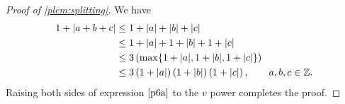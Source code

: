 %
%
\begin{proof}[Proof of \cref{plem:splitting}] We have
%
%
\begin{equation}
	\label{p6a}
	\begin{split}
		1 + | a + b + c| 
		& \le 1 + | a | + | b | + | c |
		\\
		& \le 1 + | a | + 1 + | b | + 1 + | c |
		\\
		& \le 3\left( \max\{1+| a |, 1+| b |, 1+ | c | \}\right)
		\\
		& \le 3 \left( 1 + | a | \right)\left( 1 + | b | \right) \left( 1 + |
		c |
		\right), \qquad a, b, c \in \mathbb{Z}.
	\end{split}
\end{equation}
%
%
Raising both sides of expression $\eqref{p6a}$ to the $v$ power completes 
the proof. 
\end{proof}
%
%
